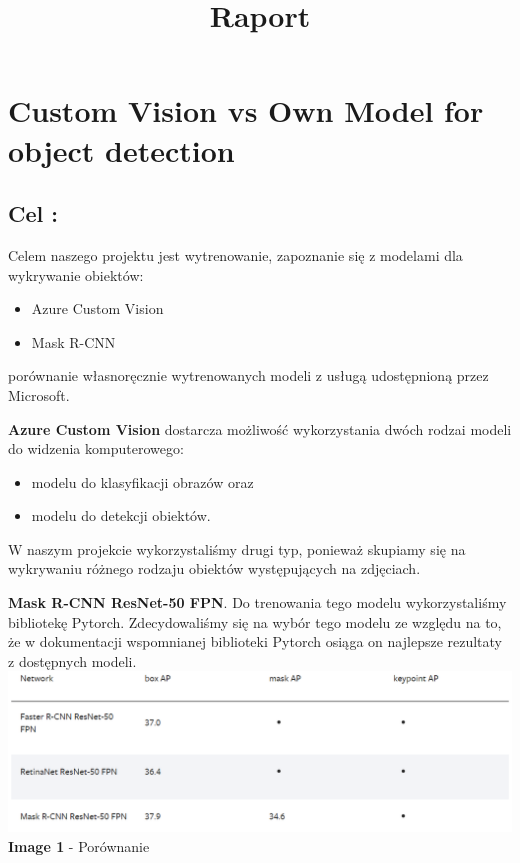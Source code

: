 \documentclass[11pt]{article}
\title{Raport}
\begin{document}
    \maketitle
    \tableofcontents
    

    
    \hypertarget{custom-vision-vs-own-model-for-object-detection}{%
\section{Custom Vision vs Own Model for object
detection}\label{custom-vision-vs-own-model-for-object-detection}}

\hypertarget{cel}{%
\subsection{Cel :}\label{cel}}

Celem naszego projektu jest wytrenowanie, zapoznanie się z modelami dla
wykrywanie obiektów: 
\begin{itemize}
    \item Azure Custom Vision
    \item Mask R-CNN
\end{itemize}
porównanie własnoręcznie wytrenowanych modeli z usługą udostępnioną
przez Microsoft.

\textbf{Azure Custom Vision} dostarcza możliwość wykorzystania dwóch
rodzai modeli do widzenia komputerowego:
\begin{itemize}
    \item modelu do klasyfikacji obrazów oraz
    \item modelu do detekcji obiektów.
\end{itemize}
W naszym projekcie wykorzystaliśmy drugi typ, ponieważ skupiamy się na wykrywaniu różnego rodzaju obiektów występujących na zdjęciach.

\textbf{Mask R-CNN ResNet-50 FPN}. Do trenowania tego modelu
wykorzystaliśmy bibliotekę Pytorch. Zdecydowaliśmy się na wybór tego
modelu ze względu na to, że w dokumentacji wspomnianej biblioteki
Pytorch osiąga on najlepsze rezultaty z dostępnych modeli.
\includegraphics{image_report/porownanie.png} \newline
\textbf{Image 1} - Porównanie
\end{document}
